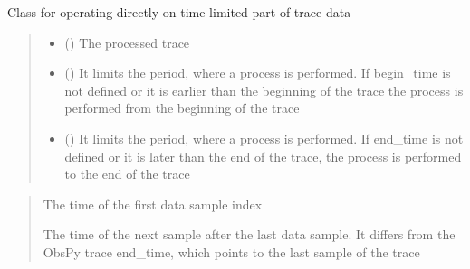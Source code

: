 \documentclass[letterpaper,10pt,english]{sphinxmanual}
\begin{document}
\begin{fulllineitems}
\label{\detokenize{api_core:core.utils.IndexTrace}}
\pysigstartsignatures
{}
\pysigstopsignatures
\sphinxAtStartPar
Class for operating directly on time limited part of trace data
\begin{quote}\begin{description}
\begin{itemize}
\item {} 
\sphinxAtStartPar
{} () \textendash{} The processed trace

\item {} 
\sphinxAtStartPar
{} () \textendash{} It limits the period, where a process is performed.
If begin\_time is not defined or it is earlier than the beginning of the trace
the process is performed from the beginning of the trace

\item {} 
\sphinxAtStartPar
{} () \textendash{} It limits the period, where a process is performed.
If end\_time is not defined or it is later than the end of the trace,
the process is performed to the end of the trace

\end{itemize}

\end{description}\end{quote}

\sphinxAtStartPar
{}
\begin{quote}\begin{description}
\sphinxAtStartPar
The time of the first data sample index

\sphinxAtStartPar
The time of the next sample after the last data sample.
It differs from the ObsPy trace end\_time, which points to the last sample of the trace


\end{description}
\end{quote}
\end{fulllineitems}
\end{document}
